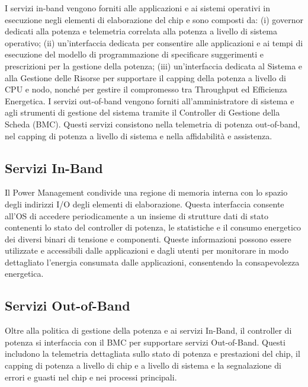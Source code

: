 I servizi in-band vengono forniti alle applicazioni e ai sistemi operativi in esecuzione negli elementi di elaborazione del chip e sono composti da: (i) governor dedicati alla potenza e telemetria correlata alla potenza a livello di sistema operativo; (ii) un'interfaccia dedicata per consentire alle applicazioni e ai tempi di esecuzione del modello di programmazione di specificare suggerimenti e prescrizioni per la gestione della potenza; (iii) un'interfaccia dedicata al Sistema e alla Gestione delle Risorse per supportare il capping della potenza a livello di CPU e nodo, nonché per gestire il compromesso tra Throughput ed Efficienza Energetica. I servizi out-of-band vengono forniti all'amministratore di sistema e agli strumenti di gestione del sistema tramite il Controller di Gestione della Scheda (BMC). Questi servizi consistono nella telemetria di potenza out-of-band, nel capping di potenza a livello di sistema e nella affidabilità e assistenza.

\subsection{Servizi In-Band}
Il Power Management condivide una regione di memoria interna con lo spazio degli indirizzi I/O degli elementi di elaborazione. Questa interfaccia consente all'OS di accedere periodicamente a un insieme di strutture dati di stato contenenti lo stato del controller di potenza, le statistiche e il consumo energetico dei diversi binari di tensione e componenti. Queste informazioni possono essere utilizzate e accessibili dalle applicazioni e dagli utenti per monitorare in modo dettagliato l'energia consumata dalle applicazioni, consentendo la consapevolezza energetica.

\subsection{Servizi Out-of-Band}
Oltre alla politica di gestione della potenza e ai servizi In-Band, il controller di potenza si interfaccia con il BMC per supportare servizi Out-of-Band. Questi includono la telemetria dettagliata sullo stato di potenza e prestazioni del chip, il capping di potenza a livello di chip e a livello di sistema e la segnalazione di errori e guasti nel chip e nei processi principali.

